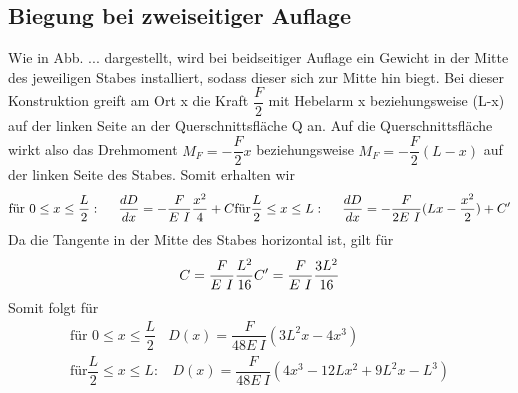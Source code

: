 \subsection{Biegung bei zweiseitiger Auflage}
    Wie in Abb. ... dargestellt, wird bei beidseitiger Auflage ein Gewicht in der Mitte des 
    jeweiligen Stabes installiert, sodass dieser sich zur Mitte hin biegt. Bei dieser 
    Konstruktion greift am Ort x die Kraft $\dfrac{F}{2}$ mit Hebelarm x 
    beziehungsweise (L-x) auf der linken Seite an der Querschnittsfläche Q
    an. Auf die Querschnittsfläche wirkt also das Drehmoment $M_F = -\dfrac{F}{2} x$ 
    beziehungsweise $M_F = -\dfrac{F}{2}(L-x)$ auf der linken Seite des Stabes.
    Somit erhalten wir 
    \begin{equation}
        \text{für } 0 \leq x \leq \dfrac{L}{2}:\ \ \ \ \dfrac{d D}{dx}=-\dfrac{F}{E\ I}\dfrac{x^2}{4}+C \\
        \text{für} \dfrac{L}{2} \leq x \leq L:\ \ \ \ \dfrac{d D}{dx}=-\dfrac{F}{2 E\ I}(Lx - \dfrac{x^2}{2})+C'
    \end{equation}
    Da die Tangente in der Mitte des Stabes horizontal ist, gilt für 
    \begin{equation*}
        C = \dfrac{F}{E\ I}\dfrac{L^2}{16} \\
        C'=\dfrac{F}{E\ I}\dfrac{3L^2}{16}
    \end{equation*}
    Somit folgt für 
    \begin{align}
        \text{für } 0 \leq x \leq \dfrac{L}{2}\ \ \ \ D(x)=\dfrac{F}{48 E\ I}(3L^2x-4x^3) \\
        \text{für} \dfrac{L}{2} \leq x \leq L:\ \ \ \ D(x)=\dfrac{F}{48 E\ I}(4 x^3-12Lx^2+9L^2x-L^3) 
    \end{align}

